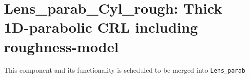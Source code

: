 \section{Lens\_parab\_Cyl\_rough: Thick 1D-parabolic CRL including roughness-model}

This component and its functionality is scheduled to be merged into \texttt{Lens\_parab}


